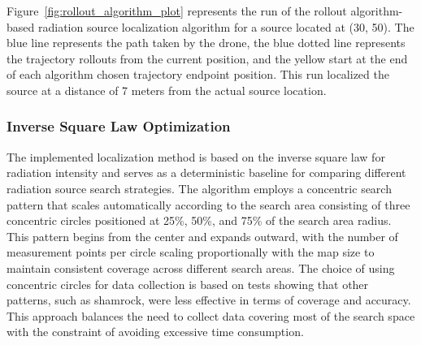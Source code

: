 \documentclass[../report.tex]{subfiles}
\begin{document}
    Figure~\ref{fig:rollout_algorithm_plot} represents the run of the rollout algorithm-based radiation source localization algorithm for a source located at (30, 50). The blue line represents 
    the path taken by the drone, the blue dotted line represents the trajectory rollouts from the current position, and the yellow start at the end of each algorithm chosen trajectory endpoint
    position. This run localized the source at a distance of 7 meters from the actual source location. 

    \subsubsection{Inverse Square Law Optimization}
    The implemented localization method is based on the inverse square law for radiation intensity and serves as a deterministic baseline for comparing different 
    radiation source search strategies. The algorithm employs a concentric search pattern that scales automatically according to the search area consisting of 
    three concentric circles positioned at 25\%, 50\%, and 75\% of the search area radius. This pattern begins from the center and expands outward, with the number 
    of measurement points per circle scaling proportionally with the map size to maintain consistent coverage across different search areas. The choice of using 
    concentric circles for data collection is based on tests showing that other patterns, such as shamrock, were less effective in terms of coverage and accuracy. 
    This approach balances the need to collect data covering most of the search space with the constraint of avoiding excessive time consumption.

\end{document}
